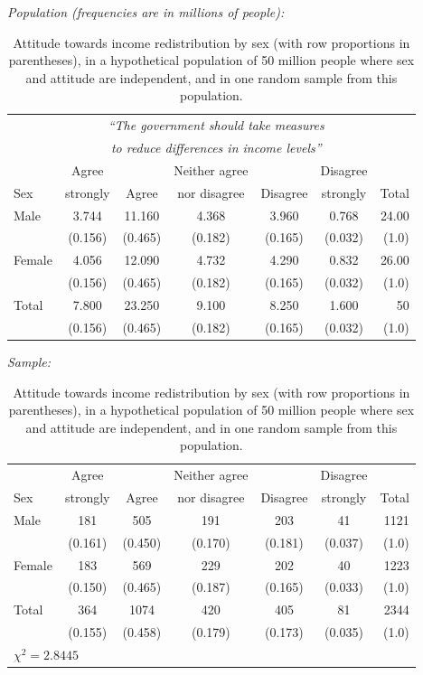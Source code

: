 \begin{table}[t]
\caption{Attitude towards income redistribution by sex (with row
proportions in parentheses), in a hypothetical
population of 50 million people where sex and attitude are independent,
and in one random sample from this population.}
\label{t_sex_attitude_H0pop}

\vspace*{1ex}
\emph{Population (frequencies are in millions of people):}
\begin{center}
\begin{tabular}{|l|ccccc|r|}\hline
& \multicolumn{5}{|c|}{\emph{``The government should
take measures}} & \\
& \multicolumn{5}{|c|}{\emph{to reduce differences in income levels''}}
& \\[.3ex]
 & Agree & & Neither agree & & Disagree & \\
Sex & strongly & Agree & nor disagree & Disagree & strongly & Total \\ \hline
Male & 3.744& 11.160& 4.368& 3.960& 0.768&  24.00\\
 & (0.156) & (0.465) & (0.182) & (0.165)& (0.032) & (1.0)  \\[.5ex]
Female & 4.056& 12.090& 4.732& 4.290& 0.832& 26.00\\
 & (0.156) & (0.465) & (0.182) & (0.165)& (0.032) & (1.0) \\
\hline
Total & 7.800 & 23.250 &  9.100&  8.250& 1.600 & 50 \\
 & (0.156) & (0.465) & (0.182) & (0.165)& (0.032) & (1.0) \\
\hline
\end{tabular}
\end{center}
\vspace*{1ex}
\emph{Sample:}
\begin{center}
\begin{tabular}{|l|ccccc|r|}\hline
 & Agree & & Neither agree & & Disagree & \\
Sex & strongly & Agree & nor disagree & Disagree & strongly & Total \\ \hline
Male & 181& 505& 191& 203& 41& 1121 \\
 & (0.161) & (0.450) & (0.170) & (0.181)& (0.037) & (1.0)  \\[.5ex]
Female & 183& 569& 229& 202& 40& 1223\\
 & (0.150) & (0.465) & (0.187) & (0.165)& (0.033) & (1.0) \\
\hline
Total & 364& 1074& 420& 405& 81& 2344 \\
 & (0.155) & (0.458) & (0.179) & (0.173)& (0.035) & (1.0) \\
\hline
\multicolumn{7}{l}{\small $\chi^{2}=2.8445$}
\end{tabular}
\end{center}
\vspace*{-3ex}
\end{table}

